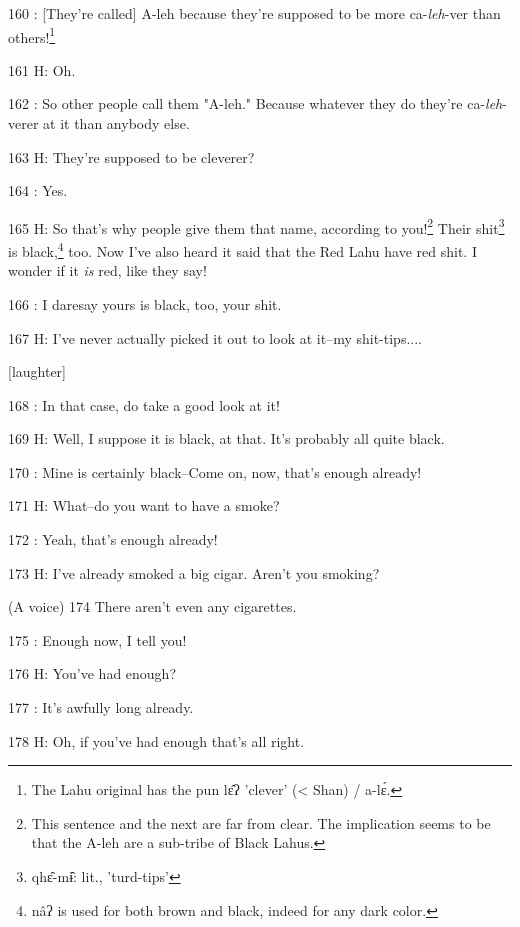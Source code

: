 160  : [They're called] A-leh because they're supposed to be more ca-\textit{leh}-ver
than others!\footnote{The Lahu original has the pun lɛ̂ʔ 'clever' (< Shan) / a-lɛ́.}

161 H: Oh.

162  : So other people call them "A-leh." Because whatever they
do they're ca-\textit{leh}-verer at it than anybody else.

163 H: They're supposed to be cleverer?

164  : Yes.

165 H: So that's why people give them that name, according to you!\footnote{This sentence and the next are far from clear. The implication seems to be that the A-leh are a sub-tribe of Black Lahus.} Their shit\footnote{qhɛ̂-mɨ̂: lit., 'turd-tips'}
is black,\footnote{nâʔ is used for both brown and black, indeed for any dark color.} too. Now I've also heard it said that the Red Lahu have red shit.
I wonder if it \textit{is }red, like they say!

166  : I daresay yours is black, too, your shit.

167  H: I've never actually picked it out to look at it--my shit-tips....

[laughter]

168  : In that case, do take a good look at it!

169 H: Well, I suppose it is black, at that. It's probably all quite black.

170  : Mine is certainly black--Come on, now, that's enough already!

171 H: What--do you want to have a smoke?

172  : Yeah, that's enough already!

173 H: I've already smoked a big cigar. Aren't you smoking?

(A voice) 174 There aren't even any cigarettes.

175  : Enough now, I tell you!

176 H: You've had enough?

177  : It's awfully long already.

178 H: Oh, if you've had enough that's all right.

